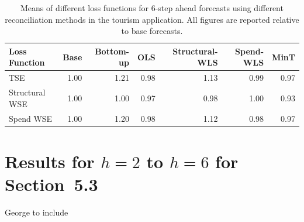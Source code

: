 \documentclass[12pt]{article}
\begin{document}
  \begin{table}[ht]
    \centering
	\begin{tabular}{lrrrrrr}
		\hline
		Loss Function & Base & Bottom-up & OLS & Structural-WLS & Spend-WLS & MinT \\
		\hline
		TSE & 1.00 & 1.21 & 0.98 & 1.13 & 0.99 & 0.97 \\
		Structural WSE & 1.00 & 1.00 & 0.97 & 0.98 & 1.00 & 0.93 \\
		Spend WSE & 1.00 & 1.20 & 0.98 & 1.12 & 0.98 & 0.97 \\
		\hline
	\end{tabular}
	\caption{Means of different loss functions for 6-step ahead forecasts using different reconciliation methods in the tourism application.  All figures are reported relative to base forecasts.}
	\label{tab:sec52h6}
  \end{table}

  \section{Results for $h=2$ to $h=6$ for Section~5.3}

  George to include
\end{document}
